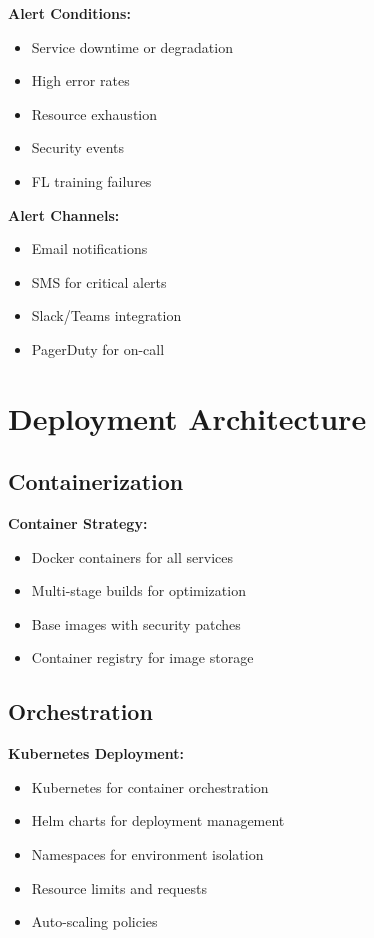 \documentclass[12pt,a4paper]{article}
\begin{document}
\textbf{Alert Conditions:}
\begin{itemize}[leftmargin=1cm,itemsep=0pt]
    \item Service downtime or degradation
    \item High error rates
    \item Resource exhaustion
    \item Security events
    \item FL training failures
\end{itemize}

\textbf{Alert Channels:}
\begin{itemize}[leftmargin=1cm,itemsep=0pt]
    \item Email notifications
    \item SMS for critical alerts
    \item Slack/Teams integration
    \item PagerDuty for on-call
\end{itemize}

\section{Deployment Architecture}

\subsection{Containerization}

\textbf{Container Strategy:}
\begin{itemize}[leftmargin=1cm,itemsep=0pt]
    \item Docker containers for all services
    \item Multi-stage builds for optimization
    \item Base images with security patches
    \item Container registry for image storage
\end{itemize}

\subsection{Orchestration}

\textbf{Kubernetes Deployment:}
\begin{itemize}[leftmargin=1cm,itemsep=0pt]
    \item Kubernetes for container orchestration
    \item Helm charts for deployment management
    \item Namespaces for environment isolation
    \item Resource limits and requests
    \item Auto-scaling policies
\end{itemize}
\end{document}
